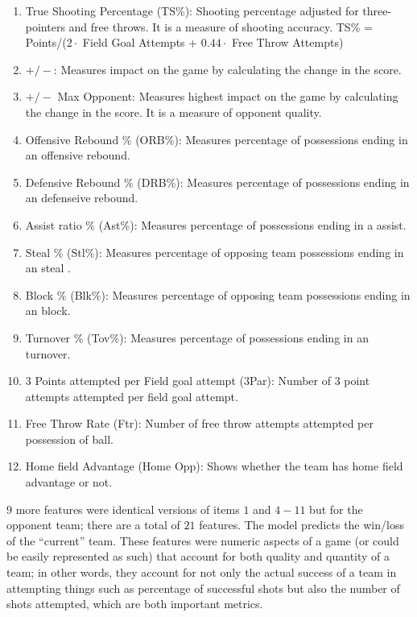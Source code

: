 \documentclass[10pt,twocolumn,letterpaper]{article}
\begin{document}
\begin{enumerate}
    \item True Shooting Percentage (TS\%): Shooting percentage adjusted for three-pointers and free throws. It is a measure of shooting accuracy. TS\% = Points/($2 \cdot $ Field Goal Attempts + $0.44 \cdot$ Free Throw Attempts)  \\
    \item $+/-$: Measures impact on the game by calculating the change in the score. \\
    \item $+/-$ Max Opponent: Measures highest impact on the game by calculating the change in the score. It is a measure of opponent quality. \\
    \item Offensive Rebound \% (ORB\%): Measures percentage of possessions ending in an offensive rebound. \\
    \item Defensive Rebound \% (DRB\%): Measures percentage of possessions ending in an defenseive rebound. \\
    \item Assist ratio \% (Ast\%): Measures percentage of possessions ending in a assist. \\
    \item Steal \% (Stl\%): Measures percentage of opposing team possessions ending in an steal . \\
    \item Block \% (Blk\%): Measures percentage of opposing team possessions ending in an block. \\
    \item Turnover \% (Tov\%): Measures percentage of possessions ending in an turnover. \\
    \item $3$ Points attempted per Field goal attempt ($3$Par): Number of $3$ point attempts attempted per field goal attempt. \\
    \item Free Throw Rate (Ftr): Number of free throw attempts attempted per possession of ball. \\
    \item Home field Advantage (Home Opp): Shows whether the team has home field advantage or not. \\
\end{enumerate}

$9$ more features were identical versions of items $1$ and $4-11$ but for the opponent team; there are a total of $21$ features. The model predicts the win/loss of the ``current'' team.
These features were numeric aspects of a game (or could be easily represented as such) that account for both quality and quantity of a team; in other words, they account for not only the actual success of a team in attempting things such as percentage of successful shots but also the number of shots attempted, which are both important metrics. \\
\end{document}
